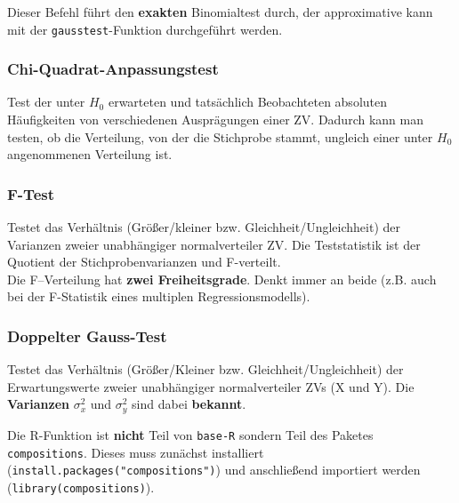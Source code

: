 \documentclass[a4paper]{article}
\newcommand\dangersign{%
 \makebox[1.8em][c]{%
 \makebox[0pt][c]{\raisebox{.15em}{\small!}}%
 \makebox[0pt][c]{\color{red}\Large$\triangle$}}}%
\begin{document}
\noindent \dangersign Dieser Befehl führt den \textbf{exakten} Binomialtest durch, der approximative kann mit der \texttt{gausstest}-Funktion durchgeführt werden.

\subsubsection{Chi-Quadrat-Anpassungstest}\label{sec:chitest1}
Test der unter $H_0$ erwarteten und tatsächlich Beobachteten absoluten Häufigkeiten von verschiedenen Ausprägungen einer ZV. Dadurch kann man testen, ob die Verteilung, von der die Stichprobe stammt, ungleich einer unter $H_0$ angenommenen Verteilung ist.

\subsubsection{F-Test}\label{sec:ftest}
Testet das Verhältnis (Größer/kleiner bzw. Gleichheit/Ungleichheit) der Varianzen zweier unabhängiger normalverteiler ZV. Die Teststatistik ist der Quotient der Stichprobenvarianzen und F-verteilt.\\

\noindent \dangersign Die F--Verteilung hat \textbf{zwei Freiheitsgrade}. Denkt immer an beide (z.B. auch bei der F-Statistik eines multiplen Regressionsmodells).\\

\noindent {}

\subsubsection{Doppelter Gauss-Test}\label{sec:Gausstest2}
Testet das Verhältnis (Größer/Kleiner bzw. Gleichheit/Ungleichheit) der Erwartungswerte zweier unabhängiger normalverteiler ZVs (X und Y). Die \textbf{Varianzen} $\sigma_x^2$ und $\sigma_y^2$ sind dabei \textbf{bekannt}.\\

\noindent {}

\noindent \dangersign Die R-Funktion ist \textbf{nicht} Teil von \texttt{base-R} sondern Teil des Paketes \texttt{compositions}. Dieses muss zunächst installiert (\texttt{install.packages("compositions")}) und anschließend importiert werden (\texttt{library(compositions)}). 
\end{document}
